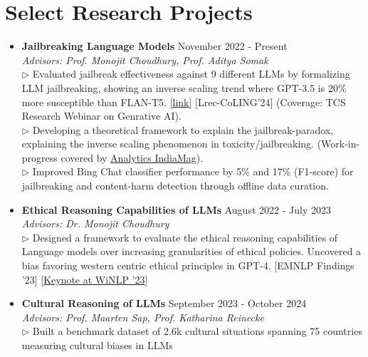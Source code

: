 \documentclass[11pt,letterpaper]{article}
\begin{document}
\section*{Select Research Projects}
\begin{itemize}[leftmargin=*,label={},itemsep=6pt]
    \item \textbf{Jailbreaking Language Models} \hfill November 2022 - Present\\
        \textit{Advisors: Prof. Monojit Choudhury, Prof. Aditya Somak}\\
        $\triangleright$ 
            Evaluated jailbreak effectiveness against 9 different LLMs by formalizing LLM jailbreaking, showing an inverse scaling trend where GPT-3.5 is 20\% more susceptible than FLAN-T5.  \href{https://aclanthology.org/2024.lrec-main.458/}{[link]} [Lrec-CoLING'24] (Coverage: TCS Research Webinar on Genrative AI).
        \\
        $\triangleright$ 
            Developing a theoretical framework to explain the jailbreak-paradox, explaining the inverse scaling phenomenon in toxicity/jailbreaking. (Work-in-progress covered by \href{https://analyticsindiamag.com/}{Analytics IndiaMag}).
        \\
        $\triangleright$ 
            Improved Bing Chat classifier performance by 5\% and 17\% (F1-score) for jailbreaking and content-harm detection through offline data curation.
        \\
    \item \textbf{Ethical Reasoning Capabilities of LLMs} \hfill August 2022 - July 2023\\
        \textit{Advisors: Dr. Monojit Choudhury}\\
        $\triangleright$ 
            Designed a framework to evaluate the ethical reasoning capabilities of Language models over increasing granularities of ethical policies. Uncovered a bias favoring western centric ethical principles in GPT-4. [EMNLP Findings '23] [\href{https://2023.winlp.org/schedule/}{Keynote at WiNLP '23}]
        \\
    \item \textbf{Cultural Reasoning of LLMs} \hfill September 2023 - October 2024\\
        \textit{Advisors: Prof. Maarten Sap, Prof. Katharina Reinecke}\\
        $\triangleright$ 
            Built a benchmark dataset of 2.6k cultural situations spanning 75 countries measuring cultural biases in LLMs
        \\

\end{itemize}
\end{document}
